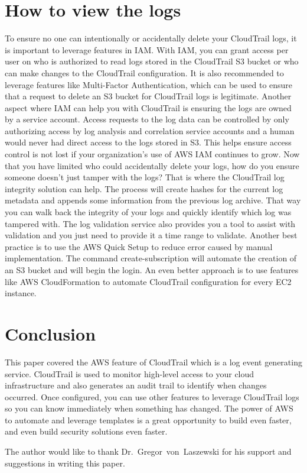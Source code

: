 \section{How to view the logs}

To ensure no one can intentionally or accidentally delete your CloudTrail logs, it is important to leverage features in IAM. With IAM, you can grant access per user on who is authorized to read logs stored in the CloudTrail S3 bucket or who can make changes to the CloudTrail configuration. It is also recommended to leverage features like Multi-Factor Authentication, which can be used to ensure that a request to delete an S3 bucket for CloudTrail logs is legitimate. 
Another aspect where IAM can help you with CloudTrail is ensuring the logs are owned by a service account. Access requests to the log data can be controlled by only authorizing access by log analysis and correlation service accounts and a human would never had direct access to the logs stored in S3. This helps ensure access control is not lost if your organization’s use of AWS IAM continues to grow. 
Now that you have limited who could accidentally delete your logs, how do you ensure someone doesn’t just tamper with the logs? That is where the CloudTrail log integrity solution can help. The process will create hashes for the current log metadata and appends some information from the previous log archive. That way you can walk back the integrity of your logs and quickly identify which log was tampered with. The log validation service also provides you a tool to assist with validation and you just need to provide it a time range to validate.
Another best practice is to use the AWS Quick Setup to reduce error caused by manual implementation. The command create-subscription will automate the creation of an S3 bucket and will begin the login. An even better approach is to use features like AWS CloudFormation to automate CloudTrail configuration for every EC2 instance.

\section{Conclusion}

This paper covered the AWS feature of CloudTrail which is a log event generating service. CloudTrail is used to monitor high-level access to your cloud infrastructure and also generates an audit trail to identify when changes occurred. Once configured, you can use other features to leverage CloudTrail logs so you can know immediately when something has changed. The power of AWS to automate and leverage templates is a great opportunity to build even faster, and even build security solutions even faster.

\begin{acks}

The author would like to thank Dr.~Gregor~von~Laszewski for his support and suggestions in writing this paper.

\end{acks}


 

